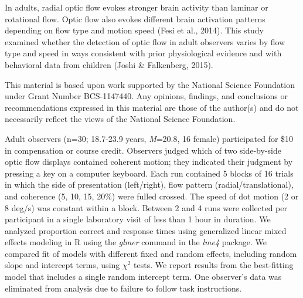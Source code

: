 \documentclass[landscape,final,a0paper,fontscale=0.285]{baposter}
\begin{document}
\begin{poster}
    {
      In adults, radial optic flow evokes stronger brain activity than laminar or rotational flow. 
      Optic flow also evokes different brain activation patterns depending on flow type and motion speed (Fesi et al., 2014). 
      This study examined whether the detection of optic flow in adult observers varies by flow type and speed in ways consistent with prior physiological evidence and with behavioral data from children (Joshi \& Falkenberg, 2015).
    }

    {
      This material is based upon work supported by the National Science Foundation under Grant Number BCS-1147440. Any opinions, findings, and conclusions or recommendations expressed in this material are those of the author(s) and do not necessarily reflect the views of the National Science Foundation.
    }

    {
      Adult observers (n=30; 18.7-23.9 years, \emph{M}=20.8, 16 female) participated for \$10 in compensation or course credit.
      Observers judged which of two side-by-side optic flow displays contained coherent motion; they indicated their judgment by pressing a key on a computer keyboard.
      Each run contained 5 blocks of 16 trials in which the side of presentation (left/right), flow pattern (radial/translational), and coherence (5, 10, 15, 20\%) were fulled crossed.
      The speed of dot motion (2 or 8 deg/s) was constant within a block.
      Between 2 and 4 runs were collected per participant in a single laboratory visit of less than 1 hour in duration. 
      We analyzed proportion correct and response times using generalized linear mixed effects modeling in R using the \emph{glmer} command in the \emph{lme4} package.
      We compared fit of models with different fixed and random effects, including random slope and intercept terms, using \(\chi^{2}\) tests. 
      We report results from the best-fitting model that includes a single random intercept term.
      One observer's data was eliminated from analysis due to failure to follow task instructions.
    }


\end{poster}
\end{document}
